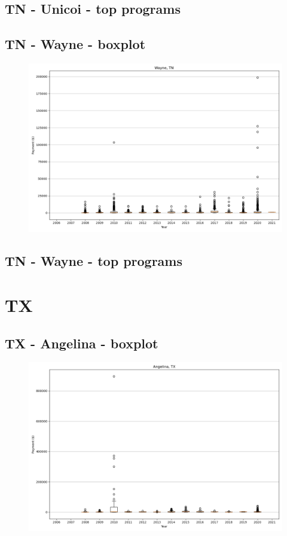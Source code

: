 \subsection*{TN - Unicoi - top programs}

\newpage
\subsection*{TN - Wayne - boxplot}
\begin{figure}[h]
\centering
\includegraphics[width=7in]{../output/boxplots/counties/Wayne-TN_boxplot.png}
\end{figure}


\subsection*{TN - Wayne - top programs}

\newpage
\section*{TX}
\subsection*{TX - Angelina - boxplot}
\begin{figure}[h]
\centering
\includegraphics[width=7in]{../output/boxplots/counties/Angelina-TX_boxplot.png}
\end{figure}


